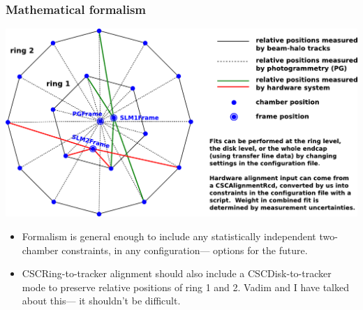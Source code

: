 \documentclass[compress]{beamer}
\begin{document}
\begin{frame}
\frametitle{Mathematical formalism}

\includegraphics[width=\linewidth]{beamhalo-PG-SLM.pdf}

\scriptsize
\begin{itemize}
\item Formalism is general enough to include any statistically
  independent two-chamber constraints, in any configuration--- options for the future.

\item CSCRing-to-tracker alignment should also include a
  CSCDisk-to-tracker mode to preserve relative positions of ring 1 and
  2.  Vadim and I have talked about this--- it shouldn't be difficult.
\end{itemize}
\label{numpages}
\end{frame}
\end{document}

